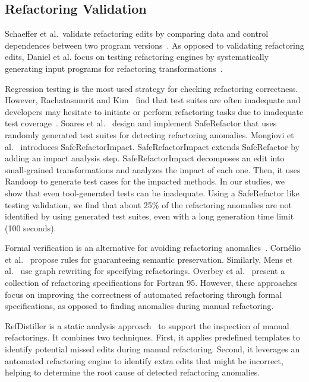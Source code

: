 \documentclass[runningheads,a4paper]{llncs}
\begin{document}
\subsection{Refactoring Validation} 



Schaeffer et al.~validate refactoring edits by comparing data and control dependences between two program versions~\cite{Schaefer2010:refactoring}. As opposed to validating refactoring edits, Daniel et al. focus on testing refactoring engines by systematically generating input programs for refactoring transformations~\cite{Brett2007:reftest}. 

Regression testing is the most used strategy for checking refactoring correctness. However, Rachatasumrit and Kim~\cite{Rachatasumrit2012:refactortest} find that test suites are often inadequate and developers may hesitate to initiate or perform refactoring tasks due to inadequate test coverage~\cite{Kim2012:FSR}. Soares et al.~\cite{Soares:icse10} design and implement SafeRefactor that uses randomly generated test suites for detecting refactoring anomalies. Mongiovi et al.~\cite{mongiovi2013making} introduces SafeRefactorImpact. SafeRefactorImpact extends SafeRefactor by adding an impact analysis step. SafeRefactorImpact decomposes an edit into small-grained transformations and analyzes the impact of each one. Then, it uses Randoop to generate test cases for the impacted methods. In our studies, we show that even tool-generated tests can be inadequate. Using a SafeRefactor like testing validation, we find that about 25\% of the refactoring anomalies are not identified by using generated test suites, even with a long generation time limit (100 seconds). 

Formal verification is an alternative for avoiding refactoring anomalies~\cite{Mens2004:SSR}. Corn\'elio et al.~\cite{cornelio2010sound} propose rules for guaranteeing semantic preservation. Similarly, Mens et al.~\cite{mens2005formalizing} use graph rewriting for specifying refactorings. Overbey et al.~\cite{overbey2010collection} present a collection of refactoring specifications for Fortran 95. However, these approaches focus on improving the correctness of automated refactoring through formal specifications, as opposed to finding anomalies during manual refactoring. 


RefDistiller is a static analysis approach~\cite{Alves2017:refdistiller,Alves:2014:RRA:2635868.2661674} to support the inspection of manual refactorings. It combines two techniques. First, it applies predefined templates to identify potential missed edits during manual refactoring. Second, it leverages an automated refactoring engine to identify extra edits that might be incorrect, helping to  determine the root cause of detected refactoring anomalies.
\end{document}
